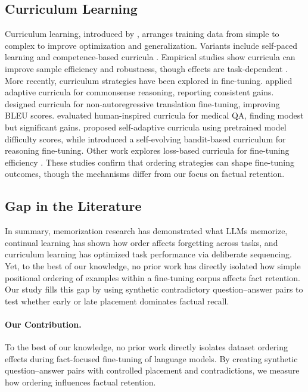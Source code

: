 \documentclass[11pt]{article}
\begin{document}
\subsection{Curriculum Learning}
Curriculum learning, introduced by \citet{bengio2009curriculum}, arranges training data from simple to complex to improve optimization and generalization. Variants include self-paced learning \citep{kumar2010self} and competence-based curricula \citep{graves2017automated}. Empirical studies show curricula can improve sample efficiency and robustness, though effects are task-dependent \citep{wu2020curricula}. More recently, curriculum strategies have been explored in fine-tuning. \citet{maharana2022curriculum} applied adaptive curricula for commonsense reasoning, reporting consistent gains. \citet{guo2019natcurriculum} designed curricula for non-autoregressive translation fine-tuning, improving BLEU scores. \citet{yang2024human} evaluated human-inspired curricula for medical QA, finding modest but significant gains. \citet{feng2025selfadaptive} proposed self-adaptive curricula using pretrained model difficulty scores, while \citet{chen2025selfevolving} introduced a self-evolving bandit-based curriculum for reasoning fine-tuning. Other work explores loss-based curricula for fine-tuning efficiency \citep{coghlan2025loss,lyu2025loss}. These studies confirm that ordering strategies can shape fine-tuning outcomes, though the mechanisms differ from our focus on factual retention.

\subsection{Gap in the Literature}
In summary, memorization research has demonstrated what LLMs memorize, continual learning has shown how order affects forgetting across tasks, and curriculum learning has optimized task performance via deliberate sequencing. Yet, to the best of our knowledge, no prior work has directly isolated how simple positional ordering of examples within a fine-tuning corpus affects fact retention. Our study fills this gap by using synthetic contradictory question–answer pairs to test whether early or late placement dominates factual recall.

\paragraph{Our Contribution.}
To the best of our knowledge, no prior work directly isolates dataset ordering effects during fact-focused fine-tuning of language models. By creating synthetic question–answer pairs with controlled placement and contradictions, we measure how ordering influences factual retention.
\end{document}
